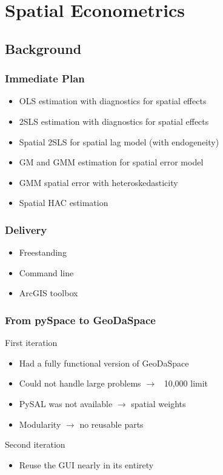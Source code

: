 \section{Spatial Econometrics} 

\subsection{Background} 

\begin{frame}
	\frametitle{Immediate Plan}
 \begin{itemize}
 \item OLS estimation with diagnostics for spatial effects
 \item 2SLS estimation with diagnostics for spatial effects
 \item Spatial 2SLS for spatial lag model (with endogeneity)
 \item GM and GMM estimation for spatial error model
 \item GMM spatial error with heteroskedasticity
 \item Spatial HAC estimation
 \end{itemize}
 \end{frame} 

\begin{frame}
	\frametitle{Delivery}
 \begin{itemize}
 \item Freestanding
 \item Command line
 \item ArcGIS toolbox
 \end{itemize}
 \end{frame} 

\begin{frame}
	\frametitle{From pySpace to GeoDaSpace}
 
\begin{block}{First iteration}
 \begin{itemize}
 \item Had a fully functional version of GeoDaSpace
 \item Could not handle large problems $\rightarrow$ ~10,000 limit
 \item PySAL was not available $\rightarrow$ spatial weights
 \item Modularity $\rightarrow$ no reusable parts
 \end{itemize}
 \end{block} 
\begin{block}{Second iteration}
 \begin{itemize}
 \item Reuse the GUI nearly in its entirety
 \end{itemize}
 \end{block} \end{frame} 


